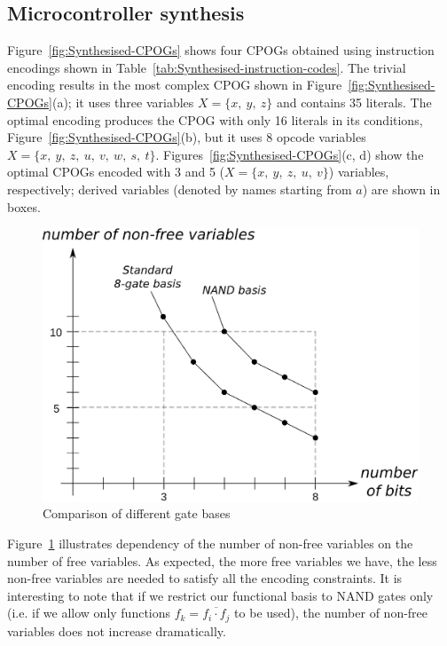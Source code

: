 \subsection{Microcontroller synthesis\label{app-sub-Microcontroller-synthesis}}

Figure~\ref{fig:Synthesised-CPOGs} shows four CPOGs obtained using
instruction encodings shown in Table~\ref{tab:Synthesised-instruction-codes}.
The trivial encoding results in the most complex CPOG shown in Figure~\ref{fig:Synthesised-CPOGs}(a);
it uses three variables $X=\{x,\ y,\ z\}$ and contains 35 literals.
The optimal encoding produces the CPOG with only 16 literals in its
conditions, Figure~\ref{fig:Synthesised-CPOGs}(b), but it uses 8
opcode variables $X=\{x,\ y,\ z,\ u,\ v,\ w,\ s,\ t\}$. Figures~\ref{fig:Synthesised-CPOGs}(c,
d) show the optimal CPOGs encoded with 3 and 5 ($X=\{x,\ y,\ z,\ u,\ v\}$)
variables, respectively; derived variables (denoted by names starting
from $a$) are shown in boxes.

\begin{figure}[h]
\begin{centering}
\includegraphics[scale=0.45]{fig/encoding_graph}
\par\end{centering}

\caption{Comparison of different gate bases\label{fig:Comparison-of-different}}
\end{figure}


Figure~\ref{fig:Comparison-of-different} illustrates dependency
of the number of non-free variables on the number of free variables.
As expected, the more free variables we have, the less non-free variables
are needed to satisfy all the encoding constraints. It is interesting
to note that if we restrict our functional basis to NAND gates only
(i.e. if we allow only functions $f_{k}=\overline{f_{i}\cdot f_{j}}$
to be used), the number of non-free variables does not increase dramatically.

